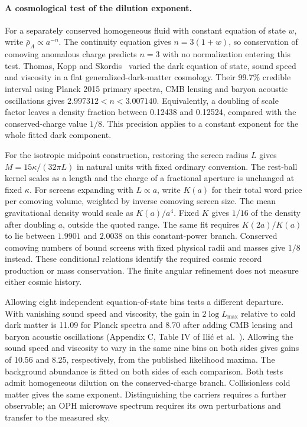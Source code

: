 \documentclass[11pt]{article}
\begin{document}
\paragraph{A cosmological test of the dilution exponent.}
For a separately conserved homogeneous fluid with constant equation
of state $w$, write $\bar\rho_A\propto a^{-n}$. The continuity
equation gives $n=3(1+w)$, so conservation of comoving anomalous
charge predicts $n=3$ with no normalization entering this test.
Thomas, Kopp and Skordis~\cite{thomasGDM} varied the dark equation of
state, sound speed and viscosity in a flat generalized-dark-matter
cosmology. Their 99.7\% credible interval using Planck 2015 primary
spectra, CMB lensing and baryon acoustic oscillations gives
$2.997312<n<3.007140$. Equivalently, a doubling of scale factor
leaves a density fraction between 0.12438 and 0.12524, compared with
the conserved-charge value $1/8$. This precision applies to a
constant exponent for the whole fitted dark component.

For the isotropic midpoint construction, restoring the screen radius
\(L\) gives \(M=15\kappa/(32\pi L)\) in natural units with fixed
ordinary conversion. The rest-ball kernel scales as a length and the
charge of a fractional aperture is unchanged at fixed \(\kappa\).
For screens expanding with \(L\propto a\), write \(K(a)\) for their
total word price per comoving volume, weighted by inverse comoving
screen size. The mean gravitational density would scale as \(K(a)/a^4\).
Fixed \(K\) gives \(1/16\) of the density after doubling \(a\),
outside the quoted range. The same fit requires \(K(2a)/K(a)\) to
lie between \(1.9901\) and \(2.0038\) on this constant-power branch.
Conserved comoving numbers of bound screens with fixed physical
radii and masses give \(1/8\) instead. These conditional relations
identify the required cosmic record production or mass conservation.
The finite angular refinement does not measure either cosmic history.

Allowing eight independent equation-of-state bins tests a different
departure. With vanishing sound speed and viscosity, the gain in
$2\log L_{\max}$ relative to cold dark matter is 11.09 for Planck
spectra and 8.70 after adding CMB lensing and baryon acoustic
oscillations (Appendix C, Table IV of Ili\'c et al.~\cite{ilicGDM}).
Allowing the sound speed and viscosity to vary in the same nine
bins on both sides gives gains of 10.56 and 8.25, respectively, from
the published likelihood maxima.
The background abundance is fitted on both sides of each comparison.
Both tests admit homogeneous dilution on the conserved-charge branch.
Collisionless cold matter gives the same exponent. Distinguishing the
carriers requires a further observable; an OPH microwave spectrum
requires its own perturbations and transfer to the measured sky.
\end{document}

